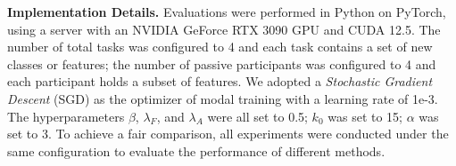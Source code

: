 \noindent\textbf{Implementation Details.}
Evaluations were performed in Python on PyTorch, using a server with an NVIDIA GeForce RTX 3090 GPU and CUDA 12.5.
The number of total tasks was configured to 4 and each task contains a set of new classes or features; the number of passive participants was configured to 4 and each participant holds a subset of features. 
We adopted a \textit{Stochastic Gradient Descent} (SGD) as the optimizer of modal training with a learning rate of 1e-3.
The hyperparameters $\beta$, $\lambda_F$, and $\lambda_A$ were all set to 0.5; $k_0$ was set to 15; $\alpha$ was set to 3. 
To achieve a fair comparison, all experiments were conducted under the same configuration to evaluate the performance of different methods.


